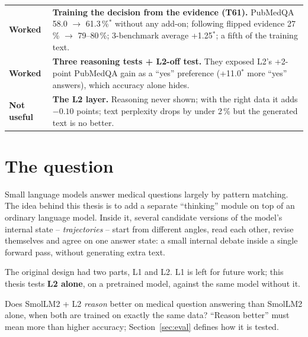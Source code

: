 \documentclass[a4paper,11pt,parskip=half]{scrartcl}
\newcommand{\sig}{\ensuremath{^{\ast}}}
\begin{document}
\tableofcontents
\vspace{1em}

\begin{rulebox}[title={Findings at a glance}]
\begin{tabularx}{\linewidth}{@{}p{3.3cm}Y@{}}
\textbf{\color{lgreen}Worked} & \textbf{Training the decision from the evidence (T61).} PubMedQA 58.0 $\rightarrow$ 61.3\,\%\sig{} without any add-on; following flipped evidence 27\,\% $\rightarrow$ 79--80\,\%; 3-benchmark average +1.25\sig; a fifth of the training text.\\[3pt]
\textbf{\color{lgreen}Worked} & \textbf{Three reasoning tests + L2-off test.} They exposed L2's +2-point PubMedQA gain as a ``yes'' preference (+11.0\sig{} more ``yes'' answers), which accuracy alone hides.\\[3pt]
\textbf{\color{lorange}Not useful} & \textbf{The L2 layer.} Reasoning never shown; with the right data it adds $-0.10$ points; text perplexity drops by under 2\,\% but the generated text is no better.
\end{tabularx}
\end{rulebox}

\section{The question}

Small language models answer medical questions largely by pattern matching.
The idea behind this thesis is to add a separate ``thinking'' module on top of
an ordinary language model. Inside it, several candidate versions of the
model's internal state -- \emph{trajectories} -- start from different angles,
read each other, revise themselves and agree on one answer state: a small
internal debate inside a single forward pass, without generating extra text.

The original design had two parts, L1 and L2. L1 is left for future work;
this thesis tests \textbf{L2 alone}, on a pretrained model, against the same
model without it.

\begin{keybox}[title={Research question}]
Does SmolLM2 + L2 \emph{reason} better on medical question answering than
SmolLM2 alone, when both are trained on exactly the same data? ``Reason
better'' must mean more than higher accuracy; Section~\ref{sec:eval} defines
how it is tested.
\end{keybox}
\end{document}
